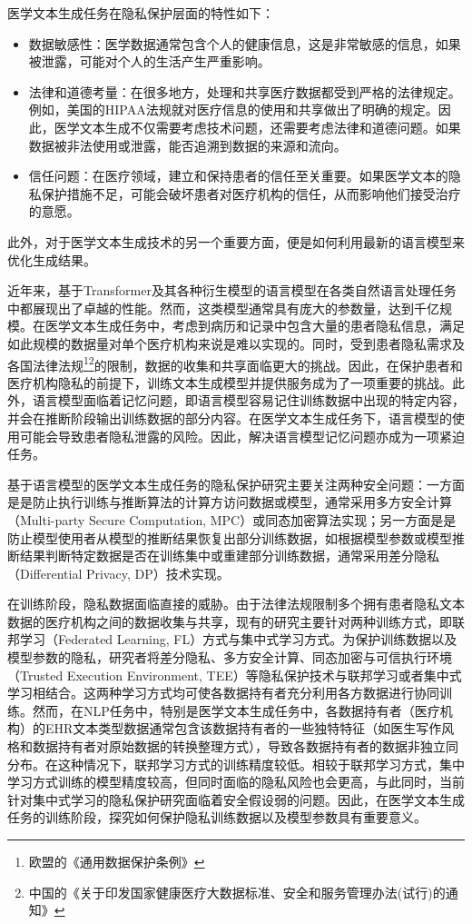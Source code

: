 医学文本生成任务在隐私保护层面的特性如下：
\begin{itemize}
	\item 数据敏感性：医学数据通常包含个人的健康信息，这是非常敏感的信息，如果被泄露，可能对个人的生活产生严重影响。
	\item 法律和道德考量：在很多地方，处理和共享医疗数据都受到严格的法律规定。例如，美国的HIPAA法规就对医疗信息的使用和共享做出了明确的规定。因此，医学文本生成不仅需要考虑技术问题，还需要考虑法律和道德问题。如果数据被非法使用或泄露，能否追溯到数据的来源和流向。
	\item 信任问题：在医疗领域，建立和保持患者的信任至关重要。如果医学文本的隐私保护措施不足，可能会破坏患者对医疗机构的信任，从而影响他们接受治疗的意愿。
\end{itemize}

此外，对于医学文本生成技术的另一个重要方面，便是如何利用最新的语言模型来优化生成结果。

近年来，基于Transformer\cite{Attn_is_all_you_need}及其各种衍生模型\cite{BERT, GPT2, GPT3}的语言模型在各类自然语言处理任务中都展现出了卓越的性能。然而，这类模型通常具有庞大的参数量，达到千亿规模。在医学文本生成任务中，考虑到病历和记录中包含大量的患者隐私信息，满足如此规模的数据量对单个医疗机构来说是难以实现的。同时，受到患者隐私需求及各国法律法规\footnote{欧盟的《通用数据保护条例》}\footnote{中国的《关于印发国家健康医疗大数据标准、安全和服务管理办法(试行)的通知》}的限制，数据的收集和共享面临更大的挑战。因此，在保护患者和医疗机构隐私的前提下，训练文本生成模型并提供服务成为了一项重要的挑战。此外，语言模型面临着记忆问题，即语言模型容易记住训练数据中出现的特定内容，并会在推断阶段输出训练数据的部分内容。在医学文本生成任务下，语言模型的使用可能会导致患者隐私泄露的风险。因此，解决语言模型记忆问题亦成为一项紧迫任务。

基于语言模型的医学文本生成任务的隐私保护研究主要关注两种安全问题：一方面是是防止执行训练与推断算法的计算方访问数据或模型，通常采用多方安全计算（Multi-party Secure Computation, MPC）或同态加密算法实现；另一方面是是防止模型使用者从模型的推断结果恢复出部分训练数据，如根据模型参数或模型推断结果判断特定数据是否在训练集中或重建部分训练数据，通常采用差分隐私（Differential Privacy, DP）技术实现。

在训练阶段，隐私数据面临直接的威胁。由于法律法规限制多个拥有患者隐私文本数据的医疗机构之间的数据收集与共享，现有的研究主要针对两种训练方式，即联邦学习\cite{FL_ZS}（Federated Learning, FL）方式与集中式学习方式。为保护训练数据以及模型参数的隐私，研究者将差分隐私\cite{DP}、多方安全计算\cite{cramer2015secure}、同态加密\cite{acar2018survey}与可信执行环境\cite{sabt2015trusted}（Trusted Execution Environment, TEE）等隐私保护技术与联邦学习或者集中式学习相结合。这两种学习方式均可使各数据持有者充分利用各方数据进行协同训练。然而，在NLP任务中，特别是医学文本生成任务中，各数据持有者（医疗机构）的EHR文本类型数据通常包含该数据持有者的一些独特特征（如医生写作风格和数据持有者对原始数据的转换整理方式），导致各数据持有者的数据非独立同分布。在这种情况下，联邦学习方式的训练精度较低\cite{CC_FL, FL_Medical_Relation_Extraction, FL_CMF}。相较于联邦学习方式，集中学习方式训练的模型精度较高，但同时面临的隐私风险也会更高，与此同时，当前针对集中式学习的隐私保护研究面临着安全假设弱的问题。因此，在医学文本生成任务的训练阶段，探究如何保护隐私训练数据以及模型参数具有重要意义。

